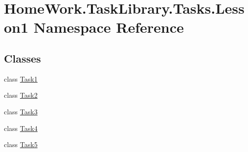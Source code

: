 \hypertarget{namespace_home_work_1_1_task_library_1_1_tasks_1_1_lesson1}{}\section{Home\+Work.\+Task\+Library.\+Tasks.\+Lesson1 Namespace Reference}
\label{namespace_home_work_1_1_task_library_1_1_tasks_1_1_lesson1}
\subsection*{Classes}
\begin{DoxyCompactItemize}
\item 
class \mbox{\hyperlink{class_home_work_1_1_task_library_1_1_tasks_1_1_lesson1_1_1_task1}{Task1}}
\item 
class \mbox{\hyperlink{class_home_work_1_1_task_library_1_1_tasks_1_1_lesson1_1_1_task2}{Task2}}
\item 
class \mbox{\hyperlink{class_home_work_1_1_task_library_1_1_tasks_1_1_lesson1_1_1_task3}{Task3}}
\item 
class \mbox{\hyperlink{class_home_work_1_1_task_library_1_1_tasks_1_1_lesson1_1_1_task4}{Task4}}
\item 
class \mbox{\hyperlink{class_home_work_1_1_task_library_1_1_tasks_1_1_lesson1_1_1_task5}{Task5}}
\end{DoxyCompactItemize}
